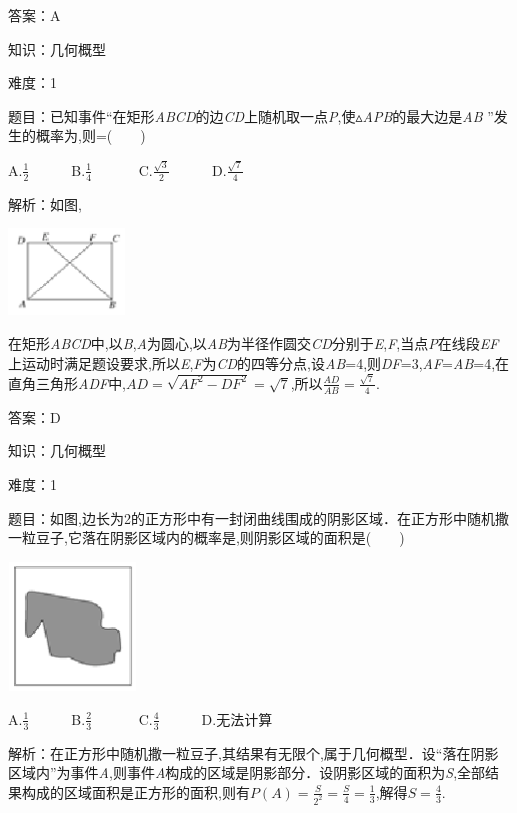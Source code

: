 \documentclass{article} %
\begin{document}
答案：A

知识：几何概型

难度：1

题目：已知事件``在矩形\textit{ABCD}的边\textit{CD}上随机取一点\textit{P},使$\mathrm{\vartriangle}$\textit{APB}的最大边是\textit{AB} ''发生的概率为,则=(　　)

A.$\frac{1}{2}$　　　B.$\frac{1}{4}$　　　
C.$\frac{\sqrt{3}}{2}$　　　D.$\frac{\sqrt{7}}{4}$　　　

解析：如图,

\includegraphics*[width=1.22in, height=0.91in, keepaspectratio=false]{image104}

在矩形\textit{ABCD}中,以\textit{B},\textit{A}为圆心,以\textit{AB}为半径作圆交\textit{CD}分别于\textit{E},\textit{F},当点\textit{P}在线段\textit{EF}上运动时满足题设要求,所以\textit{E},\textit{F}为\textit{CD}的四等分点,设\textit{AB}=4,则\textit{DF}=3,\textit{AF}=\textit{AB}=4,在直角三角形\textit{ADF}中,$AD=\sqrt{AF^2-DF^2}=\sqrt{7} $,所以$\frac{AD}{AB}=\frac{\sqrt{7}}{4}$.

答案：D



知识：几何概型

难度：1

题目：如图,边长为2的正方形中有一封闭曲线围成的阴影区域．在正方形中随机撒一粒豆子,它落在阴影区域内的概率是,则阴影区域的面积是(　　)

\includegraphics*[width=1.34in, height=1.35in, keepaspectratio=false]{image105}

A.$\frac{1}{3}$　　　B.$\frac{2}{3}$　　　
C.$\frac{4}{3}$　　　D.无法计算

解析：在正方形中随机撒一粒豆子,其结果有无限个,属于几何概型．设``落在阴影区域内''为事件\textit{A},则事件\textit{A}构成的区域是阴影部分．设阴影区域的面积为\textit{S},全部结果构成的区域面积是正方形的面积,则有$P(A)=\frac{S}{2^2}=\frac{S}{4}=\frac{1}{3}$,解得$S=\frac{4}{3}$.
\end{document}
